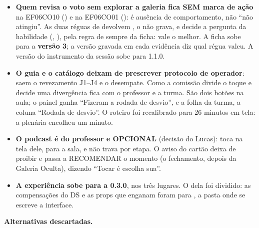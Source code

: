 \begin{itemize}
    pesos só da rodada. No fim, a tela compara, por área, o feed do júri com a
    rodada. Concluir pede os seis posts e ao menos uma curtida ou salvo, e o
    carimbo  leva o passo a . Rotas
    novas  e
    ; erros novos
     (403), ,
     e  (409).
    \textbf{Sem evidência}: a vivência é obrigatória, não medida. A migração
     preencheu
     com  nas sessões já em
     ou adiante, para a equivalência nova valer sem mudar o passo de
    ninguém.
  \item \textbf{Quem revisa o voto sem explorar a galeria fica SEM marca de
    ação} na EF06CO10 () e na EF06CO01 (): é
    ausência de comportamento, não \enquote{não atingiu}. As duas réguas de
     devolvem , o  não grava, e
    decide a pergunta da habilidade (, ), pela regra de sempre
    da ficha: vale o melhor. A ficha sobe para a \textbf{versão 3}; a versão
    gravada em cada evidência diz qual régua valeu. A versão do instrumento
    da sessão sobe para 1.1.0.
  \item \textbf{O guia e o catálogo deixam de prescrever protocolo de
    operador}: saem o revezamento J1--J4 e o desempate. Como a comissão
    divide o toque e decide uma divergência fica com o professor e a turma.
    São dois botões na aula; o painel ganha \enquote{Fizeram a rodada de
    desvio}, e a folha da turma, a coluna \enquote{Rodada de desvio}. O
    roteiro foi recalibrado para 26 minutos em tela: a plenária encolheu um
    minuto.
  \item \textbf{O podcast é do professor e OPCIONAL} (decisão do Lucas): toca na
    tela dele, para a sala, e não trava por etapa. O aviso do cartão deixa de
    proibir e passa a RECOMENDAR o momento (o fechamento, depois da Galeria
    Oculta), dizendo \enquote{Tocar é escolha sua}.
  \item \textbf{A experiência sobe para a 0.3.0}, nos três lugares. O
     dela foi dividido: as compensações do DS e as props que
    enganam foram para , a pasta onde se escreve a
    interface.
\end{itemize}

\textbf{Alternativas descartadas.}

